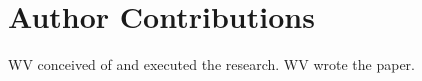 \documentclass[conference]{IEEEtran}
\begin{document}
%





\section*{Author Contributions}
WV conceived of and executed the research. WV wrote the paper.






\end{document}
